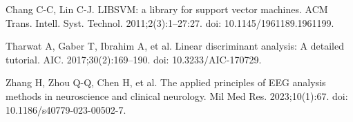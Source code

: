 \documentclass[11pt]{ctexart}
\begin{document}
\begin{enumerate}[label={[\arabic{enumi}]}, leftmargin=3.2em, itemsep=2pt]
\item Chang C-C, Lin C-J. LIBSVM: a library for support vector machines. ACM Trans. Intell. Syst. Technol. 2011;2(3):1--27:27. doi: 10.1145/1961189.1961199.
\item Tharwat A, Gaber T, Ibrahim A, et al. Linear discriminant analysis: A detailed tutorial. AIC. 2017;30(2):169--190. doi: 10.3233/AIC-170729.
\item Zhang H, Zhou Q-Q, Chen H, et al. The applied principles of EEG analysis methods in neuroscience and clinical neurology. Mil Med Res. 2023;10(1):67. doi: 10.1186/s40779-023-00502-7.
\end{enumerate}
\end{document}
